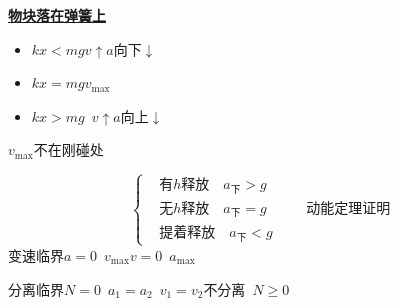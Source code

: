 \textbf{\underline{物块落在弹簧上}}


\begin{itemize}
\item[A] $kx<mg$\quad $v\uparrow$\quad $a$向下$\downarrow$
\item[O] $kx=mg$\quad $v_{\max}$
\item[B] $kx>mg$\quad {}\ $v\uparrow$\quad $a$向上$\downarrow$ %
\end{itemize}

$v_{\max}$不在刚碰处


\[
\left\{\begin{aligned}
&\text{有}h\text{释放}\quad a_{\text{下}}>g\\
&\text{无}h\text{释放}\quad a_{\text{下}}=g\\
&\text{提着释放}\quad a_{\text{下}}<g
\end{aligned}\right.
\qquad\text{动能定理证明}
\]
变速临界\quad $a=0$\ $v_{\max}$\quad $v=0$\ $a_{\max}$

分离临界\quad $N=0$\ $a_1=a_2$\ $v_1=v_2$\quad 不分离\ $N\ge 0$

